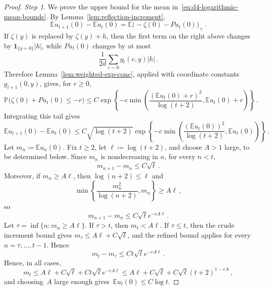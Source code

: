 \documentclass[11pt]{amsart}
\theoremstyle{plain}
\theoremstyle{definition}
\newcommand{\E}{\mathbb{E}}
\renewcommand{\P}{\mathbb{P}}
\newcommand{\one}{\mathbf{1}}
\begin{document}
\begin{proof}
			\emph{Step 1.}
			We prove the upper bound for the mean in~\eqref{eq:d4-logarithmic-mean-bounds}.
			By Lemma~\ref{lem:reflection-increment},
			\[
				\E u_{t+1}(0)-\E u_t(0)
				=
				\E\bigl(-\zeta(0)-Pu_t(0)\bigr)_+\, .
			\]
			If $\zeta(y)$ is replaced by $\zeta(y)+h$, then the first term on the right above changes by
			$\one_{\{y=0\}}|h|$, while $Pu_t(0)$ changes by at most
			\[
				\frac1{2d}\sum_{e\sim0}g_t(e,y)|h| \, .
			\]
			Therefore Lemma~\ref{lem:weighted-exp-conc}, applied with
			coordinate constants $g_{t+1}(0,y)$, gives, for $r\geq0$,
			\[
				\P\bigl(\zeta(0)+Pu_t(0)\leq-r\bigr)
				\leq
				C\exp\left\{
					-c\min\left(
						\frac{(\E u_t(0)+r)^2}{\log(t+2)},\E u_t(0)+r
					\right)
				\right\}\, .
			\]
			Integrating this tail gives
			\[
				\E u_{t+1}(0)-\E u_t(0)
				\leq
				C\sqrt{\log(t+2)}
				\exp\left\{
					-c\min\left(
						\frac{(\E u_t(0))^2}{\log(t+2)},\E u_t(0)
					\right)
				\right\}\, .
			\]
			Let $m_n\coloneqq\E u_n(0)$. Fix $t\geq2$, let $\ell\coloneqq\log(t+2)$, and choose
			$A>1$ large, to be determined below. Since $m_n$ is nondecreasing in
			$n$, for every $n<t$,
			\[
				m_{n+1}-m_n\leq C\sqrt \ell \, .
			\]
			Moreover, if $m_n\geq A\ell$, then $\log(n+2)\leq \ell$ and
			\[
				\min\left\{\frac{m_n^2}{\log(n+2)},m_n\right\}\geq A\ell\, ,
			\]
			so
			\[
				m_{n+1}-m_n\leq C\sqrt \ell e^{-cA\ell}\, .
			\]
			Let $\tau=\inf\{n:m_n\geq A\ell\}$. If $\tau>t$, then $m_t<A\ell$. If
			$\tau\leq t$, then the crude increment bound gives
			$m_\tau\leq A\ell+C\sqrt \ell$, and the refined bound applies for every
			$n=\tau,\ldots,t-1$. Hence
			\[
				m_t-m_\tau
				\leq Ct\sqrt \ell e^{-cA\ell}\, .
			\]
			Hence, in all cases,
			\[
				m_t\leq A\ell+C\sqrt \ell+Ct\sqrt \ell e^{-cA\ell}
				\leq A\ell+C\sqrt \ell+C\sqrt \ell(t+2)^{1-cA} \, , 
			\]
			and choosing~$A$ large enough gives~$\E u_t(0)\leq C\log t$.


\end{proof}
\end{document}

